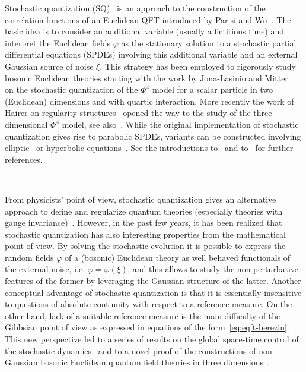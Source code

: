 \documentclass{article}
\begin{document}
Stochastic quantization
(SQ)~{\cite{jona_lasinio_stochastic_1987,damgaard_stochastic_1988}} is an
approach to the construction of the correlation functions of an Euclidean QFT
introduced by Parisi and Wu~{\cite{parisi_perturbation_1981}}. The basic idea
is to consider an additional variable (usually a fictitious time) and
interpret the Euclidean fields $\varphi$ as the stationary solution to a
stochastic partial differential equations (SPDEs) involving this additional
variable and an external Gaussian source of noise $\xi$. This strategy has
been employed to rigorously study bosonic Euclidean theories starting with the
work by Jona-Lasinio and
Mitter~{\cite{jona_lasinio_stochastic_1985,jona_lasinio_large_1990,bertini_stochastic_1993}}
on the stochastic quantization of the $\Phi^4$ model for a scalar particle in
two (Euclidean) dimensions and with quartic interaction. More recently the
work of Hairer on regularity structures~{\cite{hairer_theory_2014}} opened the
way to the study of the three dimensional $\Phi^4$ model, see
also~{\cite{catellier_paracontrolled_2013,kupiainen_renormalization_2016}}.
While the original implementation of stochastic quantization gives rise to
parabolic SPDEs, variants can be constructed involving
elliptic~{\cite{albeverio_elliptic_2018,albeverio_elliptic_2019}} or
hyperbolic
equations~{\cite{gubinelli_renormalization_2018,gubinelli_paracontrolled_2018}}.
See the introductions to~{\cite{albeverio_invariant_2017}} and
to~{\cite{gubinelli_pde_2018}} for further references.

\

From physicists' point of view, stochastic quantization gives an alternative
approach to define and regularize quantum theories (especially theories with
gauge invariance)~{\cite{damgaard_stochastic_1988,bertini_stochastic_1993}}.
However, in the past few years, it has been realized that stochastic
quantization has also interesting properties from the mathematical point of
view. By solving the stochastic evolution it is possible to express the random
fields $\varphi$ of a (bosonic) Euclidean theory as well behaved functionals
of the external noise, i.e. $\varphi = \varphi (\xi)$, and this allows to
study the non-perturbative features of the former by leveraging the Gaussian
structure of the latter. Another conceptual advantage of stochastic
quantization is that it is essentially insensitive to questions of absolute
continuity with respect to a reference measure. On the other hand, lack of a
suitable reference measure is the main difficulty of the Gibbsian point of
view as expressed in equations of the form~{\eqref{eq:eqft-berezin}}. This new
perspective led to a series of results on the global space-time control of the
stochastic
dynamics~{\cite{MWcomedown,gubinelli_global_2019,albeverio_invariant_2017,moinat_space_time_2018}}
and to a novel proof of the constructions of non-Gaussian bosonic Euclidean
quantum field theories in three dimensions~{\cite{gubinelli_pde_2018}}.
\end{document}
